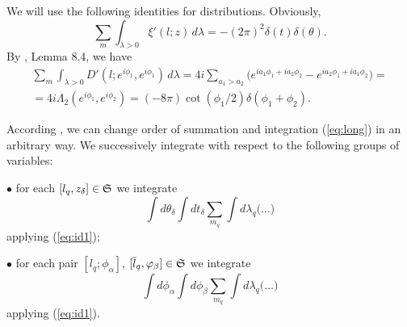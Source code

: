 \documentclass{article}
\def\sm{\smallskip}
\begin{document}



We will use the following  identities for distributions.
Obviously,
\begin{equation}
\sum_m \int_{\lambda>0} \xi'(l;z)\,d\lambda=-(2\pi)^2 \delta(t)\delta(\theta)
.
\label{eq:id1}
\end{equation}
By \cite{San}, Lemma 8.4,
we have
\begin{multline}
\sum_m \int_{\lambda>0}D'(l; e^{i\phi_1}, e^{i\phi_1})  \,d\lambda
=4i\sum_{a_1>a_2} \bigl(e^{ia_1\phi_1+ia_2 \phi_2 }- e^{ia_2\phi_1+ia_1 \phi_2 }\bigr)=
\\=
4i\Lambda_2(e^{i\phi_1},e^{i\phi_2})= (-8\pi) \cot (\phi_1/2) \delta(\phi_1+\phi_2)
.
\label{eq:id2}
\end{multline}

According \cite{San}, we can change order of summation and integration (\ref{eq:long})   in an arbitrary way.
We successively integrate with respect to the following groups
of variables:

\sm

$\bullet$  for each $[l_q,z_\delta]\in \mathfrak S$ we integrate
$$
\int d\theta_\delta \int dt_\delta \sum_{m_q} \int d\lambda_q \bigl(\dots\bigr)
$$
applying (\ref{eq:id1});

\sm

$\bullet$  for each pair
$[l_q;\phi_\alpha]$, $[\overline l_q,\varphi_\beta]\in\mathfrak S$
we integrate
$$
\int d\phi_{\alpha} \int d\phi_{\beta}
 \sum_{m_q} \int d\lambda_q \bigl(\dots\bigr)
$$
applying (\ref{eq:id1}).
\end{document}
